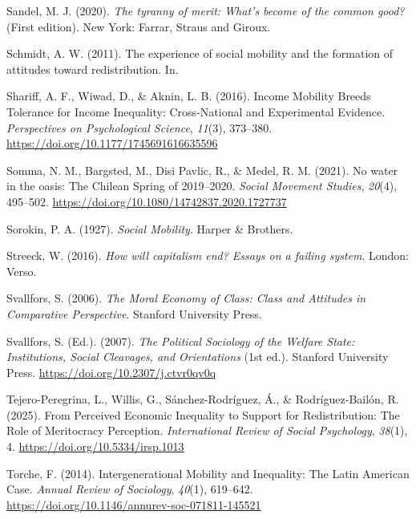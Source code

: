 \documentclass[
  12pt,
]{article}
\newlength{\cslhangindent}
\newenvironment{CSLReferences}[2] %
 {\begin{list}{}{%
  \setlength{\itemindent}{0pt}
  \setlength{\leftmargin}{0pt}
  \setlength{\parsep}{0pt}
  \ifodd #1
   \setlength{\leftmargin}{\cslhangindent}
   \setlength{\itemindent}{-1\cslhangindent}
  \fi
  \setlength{\itemsep}{#2\baselineskip}}}
 {\end{list}}
\begin{document}
\begin{CSLReferences}{1}{0}
Sandel, M. J. (2020). \emph{The tyranny of merit: {What}'s become of the
common good?} (First edition). New York: {Farrar, Straus and Giroux}.

Schmidt, A. W. (2011). The experience of social mobility and the
formation of attitudes toward redistribution. In.

Shariff, A. F., Wiwad, D., \& Aknin, L. B. (2016). Income {Mobility
Breeds Tolerance} for {Income Inequality}: {Cross-National} and
{Experimental Evidence}. \emph{Perspectives on Psychological Science},
\emph{11}(3), 373--380. \url{https://doi.org/10.1177/1745691616635596}

Somma, N. M., Bargsted, M., Disi Pavlic, R., \& Medel, R. M. (2021). No
water in the oasis: The {Chilean Spring} of 2019--2020. \emph{Social
Movement Studies}, \emph{20}(4), 495--502.
\url{https://doi.org/10.1080/14742837.2020.1727737}

Sorokin, P. A. (1927). \emph{Social {Mobility}}. Harper \& Brothers.

Streeck, W. (2016). \emph{How will capitalism end? Essays on a failing
system}. London: Verso.

Svallfors, S. (2006). \emph{The {Moral Economy} of {Class}: {Class} and
{Attitudes} in {Comparative Perspective}}. Stanford University Press.

Svallfors, S. (Ed.). (2007). \emph{The {Political Sociology} of the
{Welfare State}: {Institutions}, {Social Cleavages}, and {Orientations}}
(1st ed.). Stanford University Press.
\url{https://doi.org/10.2307/j.ctvr0qv0q}

Tejero-Peregrina, L., Willis, G., Sánchez-Rodríguez, Á., \&
Rodríguez-Bailón, R. (2025). From {Perceived Economic Inequality} to
{Support} for {Redistribution}: {The Role} of {Meritocracy Perception}.
\emph{International Review of Social Psychology}, \emph{38}(1), 4.
\url{https://doi.org/10.5334/irsp.1013}

Torche, F. (2014). Intergenerational {Mobility} and {Inequality}: {The
Latin American Case}. \emph{Annual Review of Sociology}, \emph{40}(1),
619--642. \url{https://doi.org/10.1146/annurev-soc-071811-145521}


\end{CSLReferences}
\end{document}
